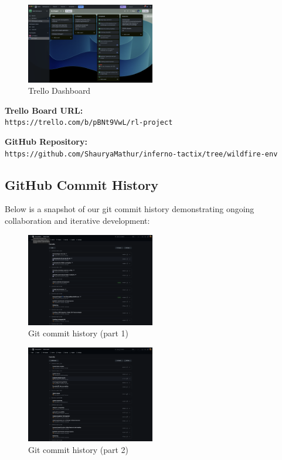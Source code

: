 \documentclass[conference]{IEEEtran}
\begin{document}
\begin{figure}[H]
    \centering
    \includegraphics[width=0.5\textwidth]{trello_rl.png}
    \caption{Trello Dashboard}
    \end{figure}

\vspace{-0.3cm}
\noindent\textbf{Trello Board URL:} \\
\texttt{https://trello.com/b/pBNt9VwL/rl-project}

\vspace{0.3cm}
\noindent\textbf{GitHub Repository:} \\
\texttt{https://github.com/ShauryaMathur/inferno-tactix/tree/wildfire-env}

\subsection{GitHub Commit History}
\hspace{-0.4cm}Below is a snapshot of our git commit history demonstrating ongoing collaboration and iterative development:

\begin{figure}[H]
\centering
\includegraphics[width=0.5\textwidth]{git1.png}
\caption{Git commit history (part 1)}
\end{figure}

\begin{figure}[H]
    \centering
    \includegraphics[width=0.5\textwidth]{git2.png}
    \caption{Git commit history (part 2)}
    \end{figure}
\end{document}
